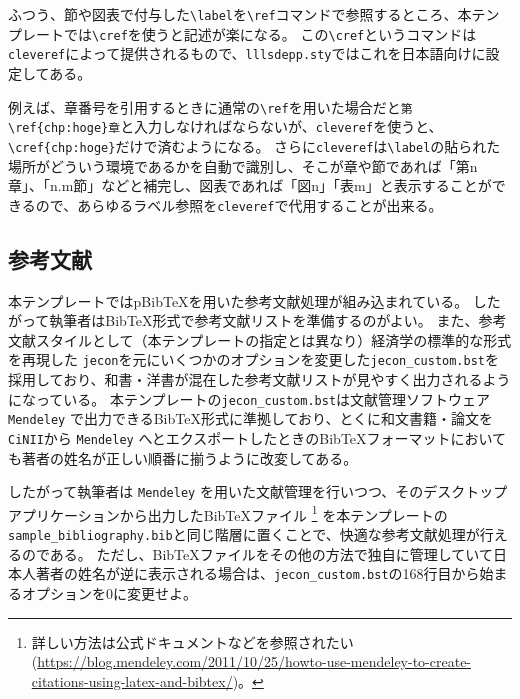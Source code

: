 				ふつう、節や図表で付与した\verb|\label|を\verb|\ref|コマンドで参照するところ、本テンプレートでは\verb|\cref|を使うと記述が楽になる。
				この\verb|\cref|というコマンドは\texttt{cleveref}によって提供されるもので、\texttt{lllsdepp.sty}ではこれを日本語向けに設定してある。

				例えば、章番号を引用するときに通常の\verb|\ref|を用いた場合だと\verb|第\ref{chp:hoge}章|と入力しなければならないが、\texttt{cleveref}を使うと、\verb|\cref{chp:hoge}|だけで済むようになる。
				さらに\texttt{cleveref}は\verb|\label|の貼られた場所がどういう環境であるかを自動で識別し、そこが章や節であれば「第n章」、「n.m節」などと補完し、図表であれば「図n」「表m」と表示することができるので、あらゆるラベル参照を\texttt{cleveref}で代用することが出来る。


			\subsection{参考文献}
				\label{sub:bibtex}

				本テンプレートではpBibTeXを用いた参考文献処理が組み込まれている。
				したがって執筆者はBibTeX形式で参考文献リストを準備するのがよい。
				また、参考文献スタイルとして（本テンプレートの指定とは異なり）経済学の標準的な形式を再現した \texttt{jecon}を元にいくつかのオプションを変更した\texttt{jecon\_custom.bst}を採用しており、和書・洋書が混在した参考文献リストが見やすく出力されるようになっている。
				本テンプレートの\texttt{jecon\_custom.bst}は文献管理ソフトウェア \texttt{Mendeley} で出力できるBibTeX形式に準拠しており、とくに和文書籍・論文を \texttt{CiNII}から \texttt{Mendeley} へとエクスポートしたときのBibTeXフォーマットにおいても著者の姓名が正しい順番に揃うように改変してある。

				したがって執筆者は \texttt{Mendeley} を用いた文献管理を行いつつ、そのデスクトップアプリケーションから出力したBibTeXファイル
				\footnote{詳しい方法は公式ドキュメントなどを参照されたい
				(\url{https://blog.mendeley.com/2011/10/25/howto-use-mendeley-to-create-citations-using-latex-and-bibtex/})。}
				を本テンプレートの\texttt{sample\_bibliography.bib}と同じ階層に置くことで、快適な参考文献処理が行えるのである。
				ただし、BibTeXファイルをその他の方法で独自に管理していて日本人著者の姓名が逆に表示される場合は、\verb|jecon_custom.bst|の168行目から始まるオプションを0に変更せよ。

